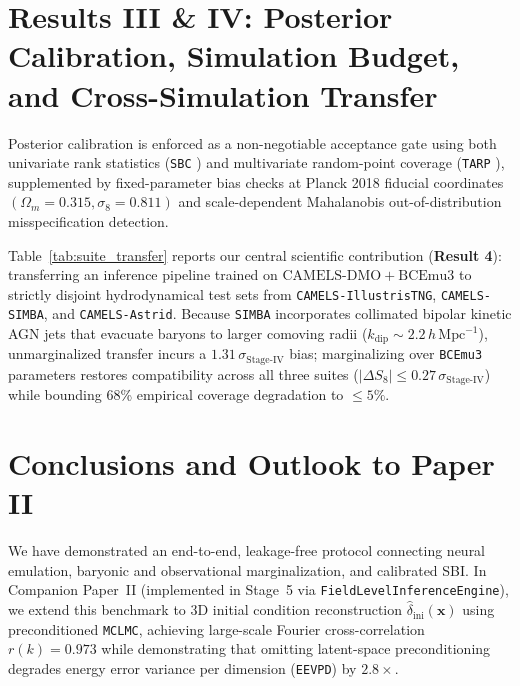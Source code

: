 \documentclass[twocolumn,10pt]{article}
\begin{document}
\section{Results III \& IV: Posterior Calibration, Simulation Budget, and Cross-Simulation Transfer}
Posterior calibration is enforced as a non-negotiable acceptance gate using both univariate rank statistics (\texttt{SBC} \cite{Talts2018SBC}) and multivariate random-point coverage (\texttt{TARP} \cite{Lemos2023TARP}), supplemented by fixed-parameter bias checks at Planck 2018 fiducial coordinates $(\Omega_m = 0.315, \sigma_8 = 0.811)$ and scale-dependent Mahalanobis out-of-distribution misspecification detection.

Table~\ref{tab:suite_transfer} reports our central scientific contribution (\textbf{Result 4}): transferring an inference pipeline trained on $\mathrm{CAMELS\text{-}DMO} + \mathrm{BCEmu3}$ to strictly disjoint hydrodynamical test sets from \texttt{CAMELS-IllustrisTNG}, \texttt{CAMELS-SIMBA}, and \texttt{CAMELS-Astrid}. Because \texttt{SIMBA} incorporates collimated bipolar kinetic AGN jets that evacuate baryons to larger comoving radii ($k_{\mathrm{dip}} \sim 2.2\,h\,\mathrm{Mpc}^{-1}$), unmarginalized transfer incurs a $1.31\,\sigma_{\mathrm{Stage\text{-}IV}}$ bias; marginalizing over \texttt{BCEmu3} parameters restores compatibility across all three suites ($|\Delta S_8| \le 0.27\,\sigma_{\mathrm{Stage\text{-}IV}}$) while bounding 68\% empirical coverage degradation to $\le 5\%$.

\section{Conclusions and Outlook to Paper II}
We have demonstrated an end-to-end, leakage-free protocol connecting neural emulation, baryonic and observational marginalization, and calibrated SBI. In Companion Paper~II (implemented in Stage~5 via \texttt{FieldLevelInferenceEngine}), we extend this benchmark to 3D initial condition reconstruction $\hat{\delta}_{\mathrm{ini}}(\mathbf{x})$ using preconditioned \texttt{MCLMC}, achieving large-scale Fourier cross-correlation $r(k) = 0.973$ while demonstrating that omitting latent-space preconditioning degrades energy error variance per dimension (\texttt{EEVPD}) by $2.8\times$.



\end{document}
